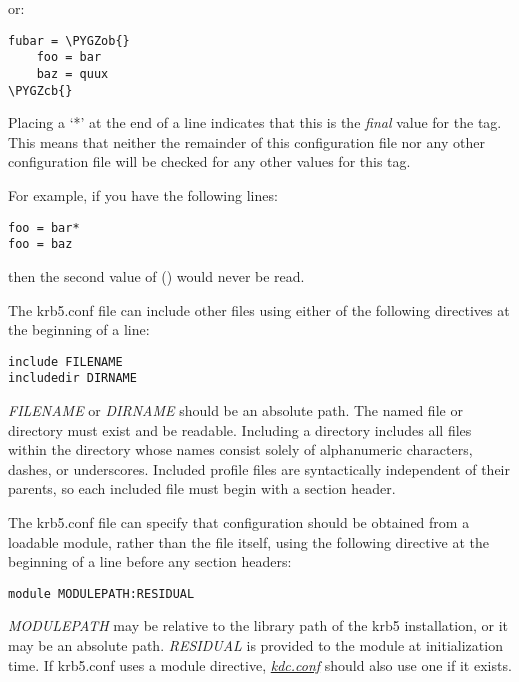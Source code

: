 \documentclass[letterpaper,10pt,english]{sphinxmanual}
\def\PYGZob{\char`\{}
\def\PYGZcb{\char`\}}
\begin{document}
or:

\begin{Verbatim}[commandchars=\\\{\}]
fubar = \PYGZob{}
    foo = bar
    baz = quux
\PYGZcb{}
\end{Verbatim}

Placing a `*' at the end of a line indicates that this is the \emph{final}
value for the tag.  This means that neither the remainder of this
configuration file nor any other configuration file will be checked
for any other values for this tag.

For example, if you have the following lines:

\begin{Verbatim}[commandchars=\\\{\}]
foo = bar*
foo = baz
\end{Verbatim}

then the second value of  () would never be read.

The krb5.conf file can include other files using either of the
following directives at the beginning of a line:

\begin{Verbatim}[commandchars=\\\{\}]
include FILENAME
includedir DIRNAME
\end{Verbatim}

\emph{FILENAME} or \emph{DIRNAME} should be an absolute path. The named file or
directory must exist and be readable.  Including a directory includes
all files within the directory whose names consist solely of
alphanumeric characters, dashes, or underscores.  Included profile
files are syntactically independent of their parents, so each included
file must begin with a section header.

The krb5.conf file can specify that configuration should be obtained
from a loadable module, rather than the file itself, using the
following directive at the beginning of a line before any section
headers:

\begin{Verbatim}[commandchars=\\\{\}]
module MODULEPATH:RESIDUAL
\end{Verbatim}

\emph{MODULEPATH} may be relative to the library path of the krb5
installation, or it may be an absolute path.  \emph{RESIDUAL} is provided
to the module at initialization time.  If krb5.conf uses a module
directive, {\hyperref[admin/conf_files/kdc_conf:kdc-conf-5]{\emph{kdc.conf}}} should also use one if it exists.
\end{document}
